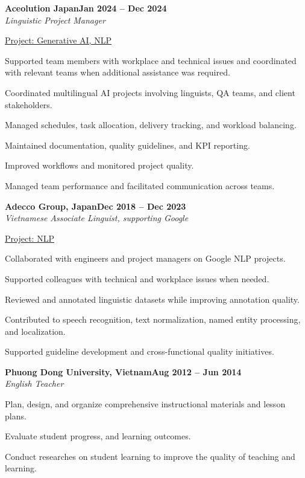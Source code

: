 \documentclass[letterpaper,10pt]{article}
\newcommand{\heading}[2]{
  \hspace{10pt}#1\hfill#2\\
}
\newcommand{\headingBf}[2]{
  \heading{\textbf{#1}}{\textbf{#2}}
}
\newcommand{\headingIt}[2]{
  \heading{\textit{#1}}{\textit{#2}}
}
\newenvironment{resume_list}{
  \vspace{-7pt}
  \begin{itemize}[itemsep=-2px, parsep=1pt, leftmargin=30pt]
}{
  \end{itemize}
}
\newcommand{\itemTitle}[1]{
  \item[] \underline{#1}\vspace{4pt}
}
\begin{document}
  \headingBf{Aceolution Japan}{Jan 2024 -- Dec 2024}
  \headingIt{Linguistic Project Manager}{}
  \begin{resume_list}

  \itemTitle{Project: Generative AI, NLP}
    \item {Supported team members with workplace and technical issues and coordinated with relevant teams when additional assistance was required.}
    \item {Coordinated multilingual AI projects involving linguists, QA teams, and client stakeholders.}
    \item {Managed schedules, task allocation, delivery tracking, and workload balancing.}
    \item {Maintained documentation, quality guidelines, and KPI reporting.}
    \item {Improved workflows and monitored project quality.}
    \item {Managed team performance and facilitated communication across teams.}
  \end{resume_list}
  
  \item{}
  \item{}
  \headingBf{Adecco Group, Japan}{Dec 2018 -- Dec 2023}
  \headingIt{Vietnamese Associate Linguist, supporting Google}{}
  \begin{resume_list}
   
    \itemTitle{Project: NLP}
    \item {Collaborated with engineers and project managers on Google NLP projects.}
    \item {Supported colleagues with technical and workplace issues when needed.}
    \item {Reviewed and annotated linguistic datasets while improving annotation quality.}
    \item {Contributed to speech recognition, text normalization, named entity processing, and localization.}
    \item {Supported guideline development and cross-functional quality initiatives.}
  \end{resume_list}

  \headingBf{Phuong Dong University, Vietnam}{Aug 2012 -- Jun 2014}
  \headingIt{English Teacher}{}
  \begin{resume_list}
   
    \item {Plan, design, and organize comprehensive instructional materials and lesson plans.} 
        \item {Evaluate student progress, and learning outcomes.}
        \item {Conduct researches on student learning to improve the quality of teaching and learning.}
  \end{resume_list}
\end{document}
